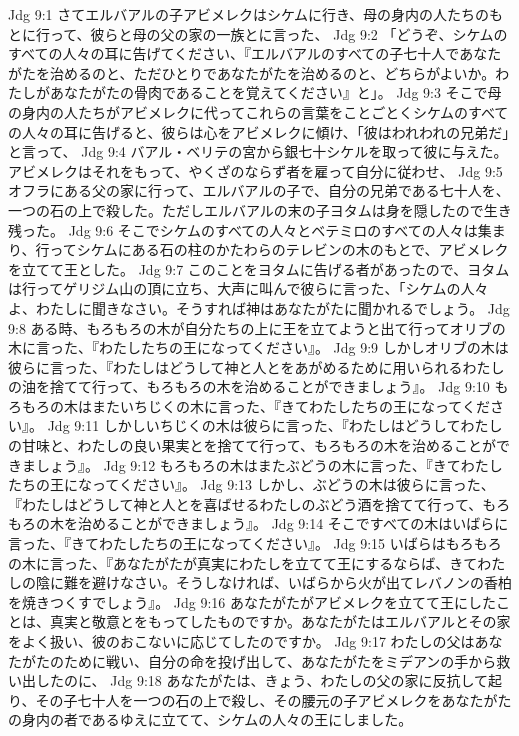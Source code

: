 Jdg 9:1  さてエルバアルの子アビメレクはシケムに行き、母の身内の人たちのもとに行って、彼らと母の父の家の一族とに言った、
Jdg 9:2  「どうぞ、シケムのすべての人々の耳に告げてください、『エルバアルのすべての子七十人であなたがたを治めるのと、ただひとりであなたがたを治めるのと、どちらがよいか。わたしがあなたがたの骨肉であることを覚えてください』と」。
Jdg 9:3  そこで母の身内の人たちがアビメレクに代ってこれらの言葉をことごとくシケムのすべての人々の耳に告げると、彼らは心をアビメレクに傾け、「彼はわれわれの兄弟だ」と言って、
Jdg 9:4  バアル・ベリテの宮から銀七十シケルを取って彼に与えた。アビメレクはそれをもって、やくざのならず者を雇って自分に従わせ、
Jdg 9:5  オフラにある父の家に行って、エルバアルの子で、自分の兄弟である七十人を、一つの石の上で殺した。ただしエルバアルの末の子ヨタムは身を隠したので生き残った。
Jdg 9:6  そこでシケムのすべての人々とベテミロのすべての人々は集まり、行ってシケムにある石の柱のかたわらのテレビンの木のもとで、アビメレクを立てて王とした。
Jdg 9:7  このことをヨタムに告げる者があったので、ヨタムは行ってゲリジム山の頂に立ち、大声に叫んで彼らに言った、「シケムの人々よ、わたしに聞きなさい。そうすれば神はあなたがたに聞かれるでしょう。
Jdg 9:8  ある時、もろもろの木が自分たちの上に王を立てようと出て行ってオリブの木に言った、『わたしたちの王になってください』。
Jdg 9:9  しかしオリブの木は彼らに言った、『わたしはどうして神と人とをあがめるために用いられるわたしの油を捨てて行って、もろもろの木を治めることができましょう』。
Jdg 9:10  もろもろの木はまたいちじくの木に言った、『きてわたしたちの王になってください』。
Jdg 9:11  しかしいちじくの木は彼らに言った、『わたしはどうしてわたしの甘味と、わたしの良い果実とを捨てて行って、もろもろの木を治めることができましょう』。
Jdg 9:12  もろもろの木はまたぶどうの木に言った、『きてわたしたちの王になってください』。
Jdg 9:13  しかし、ぶどうの木は彼らに言った、『わたしはどうして神と人とを喜ばせるわたしのぶどう酒を捨てて行って、もろもろの木を治めることができましょう』。
Jdg 9:14  そこですべての木はいばらに言った、『きてわたしたちの王になってください』。
Jdg 9:15  いばらはもろもろの木に言った、『あなたがたが真実にわたしを立てて王にするならば、きてわたしの陰に難を避けなさい。そうしなければ、いばらから火が出てレバノンの香柏を焼きつくすでしょう』。
Jdg 9:16  あなたがたがアビメレクを立てて王にしたことは、真実と敬意とをもってしたものですか。あなたがたはエルバアルとその家をよく扱い、彼のおこないに応じてしたのですか。
Jdg 9:17  わたしの父はあなたがたのために戦い、自分の命を投げ出して、あなたがたをミデアンの手から救い出したのに、
Jdg 9:18  あなたがたは、きょう、わたしの父の家に反抗して起り、その子七十人を一つの石の上で殺し、その腰元の子アビメレクをあなたがたの身内の者であるゆえに立てて、シケムの人々の王にしました。
